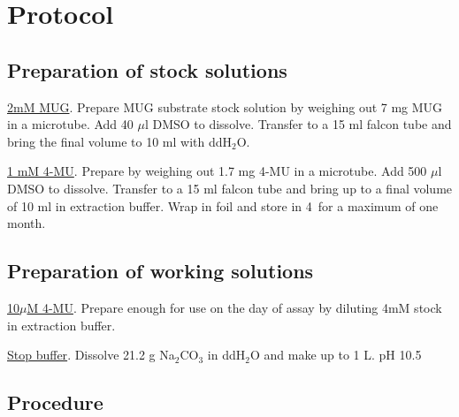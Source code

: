 \documentclass[a4paper,12pt]{article}
\newenvironment{packed_enum}{
\begin{enumerate}
  \setlength{\itemsep}{1pt}
  \setlength{\parskip}{0pt}
  \setlength{\parsep}{0pt}
}{\end{enumerate}}
\begin{document}
\section{Protocol}
	\subsection{Preparation of stock solutions}
	\begin{packed_enum}
	\item {\underline{2mM MUG}}. Prepare MUG substrate stock solution by weighing out 7 mg MUG in a microtube. Add 40 $\mu$l DMSO to dissolve. Transfer to a 15 ml falcon tube and bring the final volume to 10 ml with ddH$_{2}$O.
	\item \underline{1 mM 4-MU}. Prepare by weighing out 1.7 mg 4-MU in a microtube. Add 500 $\mu$l DMSO to dissolve. Transfer to a 15 ml falcon tube and bring up to a final volume of 10 ml in extraction buffer. Wrap in foil and store in 4\textcelsius\ for a maximum of one month.
	\end{packed_enum}
	\subsection{Preparation of working solutions}
	\begin{packed_enum}
		\item {\underline{10$\mu$M 4-MU}}. Prepare enough for use on the day of assay by diluting 4mM stock in extraction buffer.
		\item {\underline{Stop buffer}}. Dissolve 21.2 g Na$_{2}$CO$_{3}$ in ddH$_{2}$O and make up to 1 L. pH 10.5
	\end{packed_enum}
	\subsection{Procedure}
	
\end{document}
